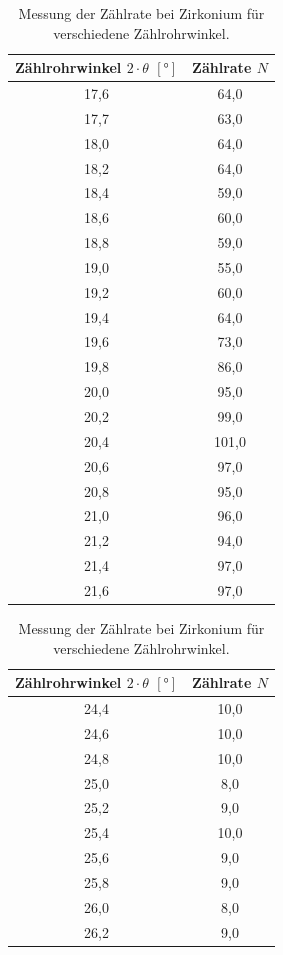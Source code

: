 \begin{table}[H]
\begin{minipage}[c]{0.5\textwidth}
    \label{tab:zirkonium}
  \begin{tabular}{c|c}
    \textbf{Zählrohrwinkel $2 \cdot \theta$ $[°]$} & \textbf{Zählrate $N$}\\
    \hline
    17,6	& 64,0 \\
    17,7	& 63,0 \\
    18,0	& 64,0 \\
    18,2	& 64,0 \\
    18,4	& 59,0 \\
    18,6	& 60,0 \\
    18,8	& 59,0 \\
    19,0	& 55,0 \\
    19,2	& 60,0 \\
    19,4	& 64,0 \\
    19,6	& 73,0 \\
    19,8	& 86,0 \\
    20,0	& 95,0 \\
    20,2	& 99,0 \\
    20,4	& 101,0 \\
    20,6	& 97,0 \\
    20,8	& 95,0 \\
    21,0	& 96,0 \\
    21,2	& 94,0 \\
    21,4	& 97,0 \\
    21,6	& 97,0
  \end{tabular}
  \captionsetup{width=7cm}
  \caption{Messung der Zählrate bei Zirkonium für verschiedene Zählrohrwinkel.}
\end{minipage}
  \hfill
\begin{minipage}[c]{0.4\textwidth}
    \label{tab:brom}
  \begin{tabular}{c|c}
    \textbf{Zählrohrwinkel $2 \cdot \theta$ $[°]$} & \textbf{Zählrate $N$}\\
    \hline
    24,4	& 10,0 \\
    24,6	& 10,0 \\
    24,8	& 10,0 \\
    25,0	& 8,0 \\
    25,2	& 9,0 \\
    25,4	& 10,0 \\
    25,6	& 9,0 \\
    25,8	& 9,0 \\
    26,0	& 8,0 \\
    26,2	& 9,0 \\

\end{tabular}
\end{minipage}
\end{table}
